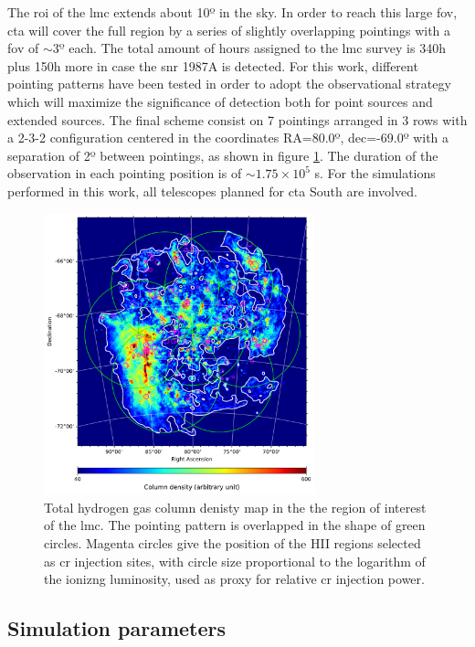 \documentclass[main.tex]{subfiles}
\begin{document}
The  \gls{roi} of the \gls{lmc} extends about 10º in the sky. In order to reach this large \gls{fov}, \gls{cta} will cover the full region by a series of slightly overlapping pointings with a \gls{fov} of $\sim 3º$ each. The total amount of hours assigned to the \gls{lmc} survey is 340h plus 150h more in case the \gls{snr} 1987A is detected. For this work, different pointing patterns have been tested in order to adopt the observational strategy which will maximize the significance of detection both for point sources and extended sources. The final scheme consist on 7 pointings arranged in 3 rows with a 2-3-2 configuration centered in the coordinates RA=80.0º, dec=-69.0º with a separation of 2º between pointings, as shown in figure \ref{fig:pointings}. The duration of the observation in each pointing position is of $\sim 1.75 \times 10^5$ s. For the simulations performed in this work, all telescopes planned for \gls{cta} South are involved. 

\begin{figure}[h]
  \centering
  \includegraphics[width=0.7\textwidth]{Pictures/map_pointings_data.pdf}
  \caption{\label{fig:pointings} Total hydrogen gas column denisty map in the the region of interest of the \gls{lmc}. The pointing pattern is overlapped in the shape of green circles. Magenta circles give the position of the HII regions selected as \gls{cr} injection sites, with circle size proportional to the logarithm of the ionizng luminosity, used as proxy for relative \gls{cr} injection power.}
\end{figure}

\subsection{Simulation parameters}
\end{document}
